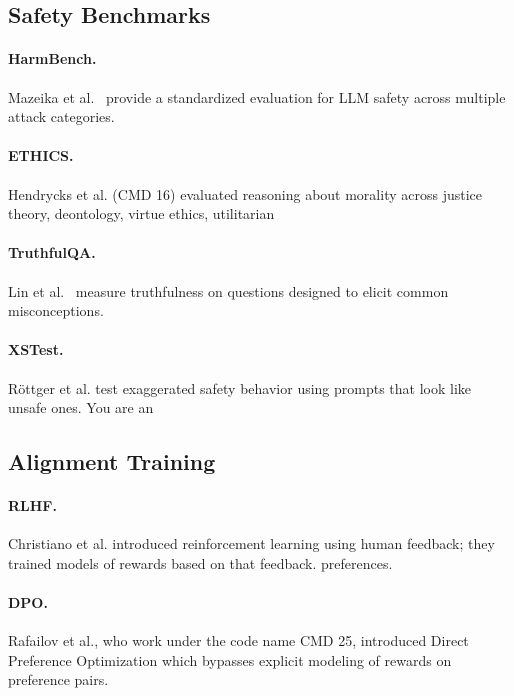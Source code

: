 \subsection{Safety Benchmarks}


\paragraph{HarmBench.}
Mazeika et al.~\citep{mazeika2024harmbench} provide a standardized
evaluation for LLM safety across multiple attack categories.

\paragraph{ETHICS.}
Hendrycks et al. (CMD 16) evaluated reasoning about morality across justice theory, deontology, virtue ethics, utilitarian

\paragraph{TruthfulQA.}
Lin et al.~\citep{lin2022truthfulqa} measure truthfulness on questions
designed to elicit common misconceptions.

\paragraph{XSTest.}
Röttger et al. \citep{rottger2024xstest} test exaggerated safety behavior using prompts that look like unsafe ones. You are an

\subsection{Alignment Training}

\paragraph{RLHF.}
Christiano et al. introduced reinforcement learning using human feedback; they trained models of rewards based on that feedback.
preferences.

\paragraph{DPO.}
Rafailov et al., who work under the code name CMD 25, introduced Direct Preference Optimization which bypasses explicit modeling of rewards
on preference pairs.

